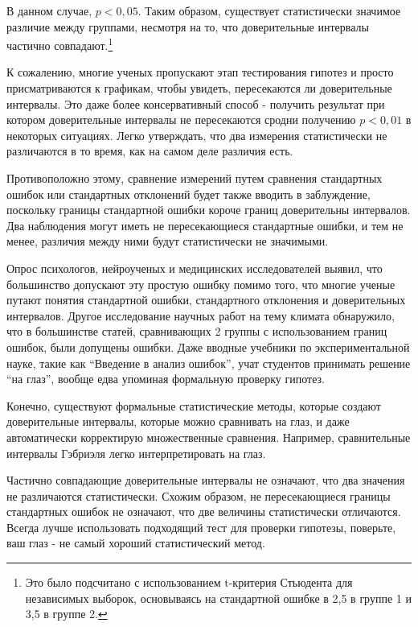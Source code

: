 В данном случае, $p < 0,05$. Таким образом, существует статистически значимое различие между группами, несмотря на то, что доверительные интервалы частично совпадают.\footnote{Это было подсчитано с использованием t-критерия Стьюдента для независимых выборок, основываясь на стандартной ошибке в 2,5 в группе 1 и 3,5 в группе 2.}

К сожалению, многие ученых пропускают этап тестирования гипотез и просто присматриваются к графикам, чтобы увидеть, пересекаются ли доверительные интервалы. Это даже более консервативный способ - получить результат при котором доверительные интервалы не пересекаются сродни получению $p < 0,01$ в некоторых ситуациях.\cite{schenker_judging_2001} Легко утверждать, что два измерения статистически не различаются в то время, как на самом деле различия есть.  

Противоположно этому, сравнение измерений путем сравнения стандартных ошибок или стандартных отклонений будет также вводить в заблуждение, поскольку границы стандартной ошибки короче границ доверительны интервалов. Два наблюдения могут иметь не пересекающиеся стандартные ошибки, и тем не менее, различия между ними будут статистически не значимыми.

Опрос психологов, нейроученых и медицинских исследователей выявил, что большинство допускают эту простую ошибку помимо того, что многие ученые путают понятия стандартной ошибки, стандартного отклонения и доверительных интервалов.\cite{belia_researchers_2005} Другое исследование научных работ на тему климата обнаружило, что в большинстве статей, сравнивающих 2 группы с использованием границ ошибок, были допущены ошибки.\cite{lanzante_cautionary_2005} Даже вводные учебники по экспериментальной науке, такие как ``Введение в анализ ошибок'', учат студентов принимать решение ``на глаз'', вообще едва упоминая формальную проверку гипотез.   

Конечно, существуют формальные статистические методы, которые создают доверительные интервалы, которые можно сравнивать на глаз, и даже автоматически корректирую множественные сравнения. Например, сравнительные интервалы Гэбриэля легко интерпретировать на глаз.\cite{gabriel_simple_1978}

Частично совпадающие доверительные интервалы не означают, что два значения не различаются статистически. Схожим образом, не пересекающиеся границы стандартных ошибок не означают, что две величины статистически отличаются. Всегда лучше использовать подходящий тест для проверки гипотезы, поверьте, ваш глаз - не самый хороший статистический метод. 